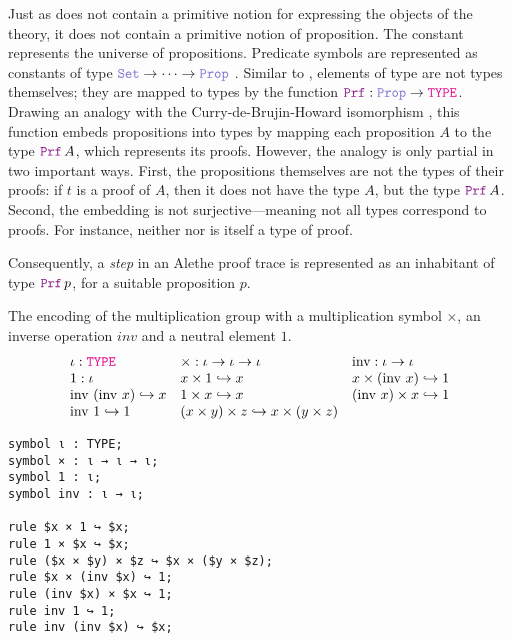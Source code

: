Just as \lpm{} does not contain a primitive notion for expressing the objects of the theory, it does not contain a primitive notion of proposition.
The constant \prop{} represents the universe of propositions. Predicate symbols are represented as constants of type $\set{} \ra \dots \ra \prop$ .
Similar to \set{}, elements of type \prop{} are not types themselves; they are mapped to types by the function $\prf{}: \prop \rightarrow \type$.
Drawing an analogy with the Curry-de-Brujin-Howard isomorphism \cite{curryhoward}, this function embeds propositions into types by mapping each proposition $A$ to the type $\prf\,A$, which represents its proofs.
However, the analogy is only partial in two important ways. First, the propositions themselves are not the types of their proofs: if $t$ is a proof of $A$, then it does not have the type $A$,
but the type $\prf\,A$. Second, the embedding is not surjective—meaning not all types correspond to proofs. For instance, neither \set{} nor \prop{} is itself a type of proof.

Consequently, a \emph{step} in an Alethe proof trace is represented as an inhabitant of type $\prf{}\,p$, for a suitable proposition $p$.

\begin{example}\label{ex:group}
The encoding of the multiplication group with a multiplication symbol $\times$, an inverse operation $inv$ and a neutral element $1$.
\[
\begin{array}{lll}
\iota : \type & \times : \iota \to \iota \to \iota & \text{inv} : \iota \to \iota \\
1 : \iota & x \times 1 \re x & x \times (\text{inv } x) \re 1 \\
\text{inv } (\text{inv } x) \re x & 1 \times x \re x & (\text{inv } x) \times x \re 1 \\
\text{inv } 1 \re 1 & (x \times y) \times z \re x \times (y \times z) & \\
\end{array}
\]
\end{example}

\begin{lstlisting}[language=Lambdapi,caption={Concetre syntax of \cref{ex:group}}, label={lst:concrete-syntax}]
symbol ι : TYPE;
symbol × : ι → ι → ι;
symbol 1 : ι;
symbol inv : ι → ι;

rule $x × 1 ↪ $x;
rule 1 × $x ↪ $x;
rule ($x × $y) × $z ↪ $x × ($y × $z);
rule $x × (inv $x) ↪ 1;
rule (inv $x) × $x ↪ 1;
rule inv 1 ↪ 1;
rule inv (inv $x) ↪ $x;
\end{lstlisting}

